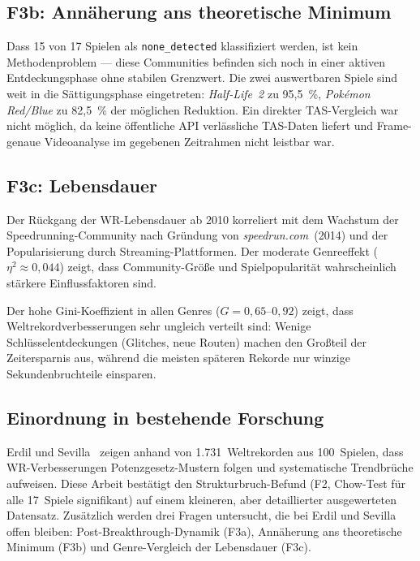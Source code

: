 \subsection*{F3b: Annäherung ans theoretische Minimum}

Dass 15 von 17 Spielen als \texttt{none\_detected} klassifiziert werden, ist kein Methodenproblem --- diese Communities befinden sich noch in einer aktiven Entdeckungsphase ohne stabilen Grenzwert. Die zwei auswertbaren Spiele sind weit in die Sättigungsphase eingetreten: \textit{Half-Life~2} zu 95,5~\%, \textit{Pokémon Red/Blue} zu 82,5~\% der möglichen Reduktion. Ein direkter TAS-Vergleich war nicht möglich, da keine öffentliche API verlässliche TAS-Daten liefert und Frame-genaue Videoanalyse im gegebenen Zeitrahmen nicht leistbar war.

\subsection*{F3c: Lebensdauer}

Der Rückgang der WR-Lebensdauer ab 2010 korreliert mit dem Wachstum der Speedrunning-Community nach Gründung von \textit{speedrun.com}~(2014) und der Popularisierung durch Streaming-Plattformen. Der moderate Genreeffekt ($\eta^2 \approx 0{,}044$) zeigt, dass Community-Größe und Spielpopularität wahrscheinlich stärkere Einflussfaktoren sind.

Der hohe Gini-Koeffizient in allen Genres ($G = 0{,}65$–$0{,}92$) zeigt, dass Weltrekordverbesserungen sehr ungleich verteilt sind: Wenige Schlüsselentdeckungen (Glitches, neue Routen) machen den Großteil der Zeitersparnis aus, während die meisten späteren Rekorde nur winzige Sekundenbruchteile einsparen.

\subsection*{Einordnung in bestehende Forschung}

Erdil und Sevilla~\cite{erdil2023} zeigen anhand von 1.731~Weltrekorden aus 100~Spielen, dass WR-Verbesserungen Potenzgesetz-Mustern folgen und systematische Trendbrüche aufweisen. Diese Arbeit bestätigt den Strukturbruch-Befund (F2, Chow-Test für alle 17~Spiele signifikant) auf einem kleineren, aber detaillierter ausgewerteten Datensatz. Zusätzlich werden drei Fragen untersucht, die bei Erdil und Sevilla offen bleiben: Post-Breakthrough-Dynamik (F3a), Annäherung ans theoretische Minimum (F3b) und Genre-Vergleich der Lebensdauer (F3c).

